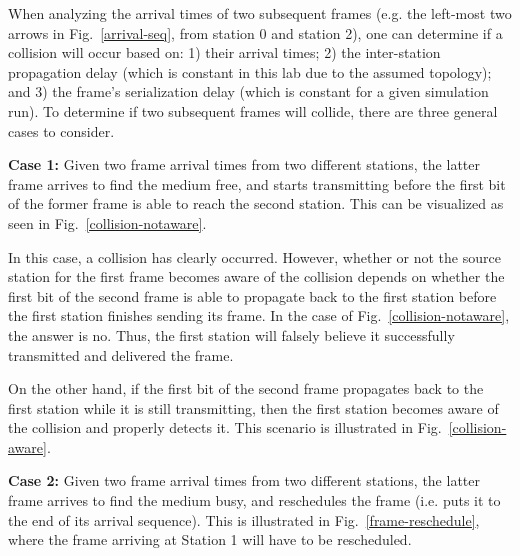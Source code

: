 \documentclass[11pt]{article}
\begin{document}

When analyzing the arrival times of two subsequent frames (e.g. the left-most two arrows in Fig.~\ref{arrival-seq}, from station 0 and station 2), one can determine if a collision will occur based on: 1) their arrival times; 2) the inter-station propagation delay (which is constant in this lab due to the assumed topology); and 3) the frame's serialization delay (which is constant for a given simulation run).
To determine if two subsequent frames will collide, there are three general cases to consider.


\textbf{Case 1:} Given two frame arrival times from two different stations, the latter frame arrives to find the medium free, and starts transmitting before the first bit of the former frame is able to reach the second station.
This can be visualized as seen in Fig.~\ref{collision-notaware}.


In this case, a collision has clearly occurred.
However, whether or not the source station for the first frame becomes aware of the collision depends on whether the first bit of the second frame is able to propagate back to the first station before the first station finishes sending its frame.
In the case of Fig.~\ref{collision-notaware}, the answer is no.
Thus, the first station will falsely believe it successfully transmitted and delivered the frame.

On the other hand, if the first bit of the second frame propagates back to the first station while it is still transmitting, then the first station becomes aware of the collision and properly detects it.
This scenario is illustrated in Fig.~\ref{collision-aware}.


\textbf{Case 2:} Given two frame arrival times from two different stations, the latter frame arrives to find the medium busy, and reschedules the frame (i.e. puts it to the end of its arrival sequence).
This is illustrated in Fig.~\ref{frame-reschedule}, where the frame arriving at Station 1 will have to be rescheduled.


\end{document}
